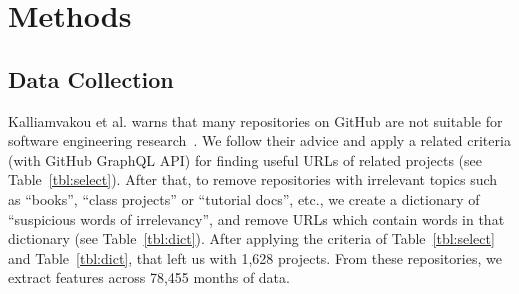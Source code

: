 \documentclass[sigconf,review,anonymous]{acmart}
\begin{document}














\section{Methods}
\label{sect:empir} 
\subsection{Data Collection}
\label{sect:data_collect}

Kalliamvakou et al. warns that  many repositories on GitHub are not suitable for   software engineering research~\cite{kalliamvakou2016depth}. We follow their advice and apply a related criteria (with GitHub GraphQL API) for finding useful URLs of related projects (see Table~\ref{tbl:select}).
After that, to remove repositories with irrelevant topics such as ``books'', ``class projects'' or ``tutorial docs'', etc., we create a dictionary of ``suspicious words of irrelevancy'', and remove URLs which contain words in that dictionary (see  Table~\ref{tbl:dict}). After applying the criteria of Table~\ref{tbl:select} and Table~\ref{tbl:dict}, that left us with 1,628 projects. From these repositories, we extract features across 78,455 months of data.
\end{document}
